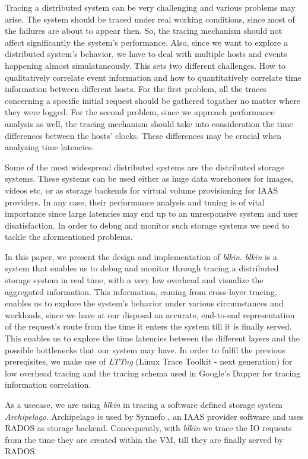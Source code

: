 \documentclass[a4paper,10pt,twocolumn]{article}
\begin{document}
Tracing a distributed system can be very challenging and various problems may
arise. The system should be traced under real working conditions, since most of
the failures are about to appear then. So, the tracing mechanism should not
affect significantly the system's performance. Also, since we want to explore a
distributed system's behavior, we have to deal with multiple hosts and events
happening almost simulataneously. This sets two different challenges.  How to
qualitatively correlate event information and how to quantitatively correlate
time information between different hosts. For the first problem, all the traces
concerning a specific initial request should be gathered togather no matter
where they were logged. For the second problem, since we approach performance
analysis as well, the tracing mechanism should take into consideration the time
differences between the hosts' clocks. These differences may be crucial when
analyzing time latencies.

Some of the most widespread distributed systems are the distributed storage
systems. These systems can be used either as huge data warehouses for images,
videos etc, or as storage backends for virtual volume provisioning for IAAS
providers. In any case, their performance analysis and tuning is of vital
importance since large latencies may end up to an unresponsive system and user
disatisfaction. In order to debug and monitor such storage systems we need to
tackle the aformentioned problems.

In this paper, we present the design and implementation of \emph{blkin}.
\emph{blkin} is a system that enables us to debug and monitor through tracing a
distributed storage system in real time, with a very low overhead and visualize
the aggregated information. This information, caming from cross-layer tracing,
enables us to explore the system's behavior under various circumstances and
workloads, since we have at our disposal an accurate, end-to-end representation
of the request's route from the time it enters the system till it is finally
served. This enables us to explore the time latencies between the different
layers and the possible bottlenecks that our system may have. In order to fulfil
the previous prereqisites, we make use of \emph{LTTng} (Linux Trace Toolkit -
next generation)\cite{lttng} for low overhead tracing and the tracing schema
used in Google's Dapper for tracing information correlation.

As a usecase, we are using \emph{blkin} in tracing a software defined storage
system \emph{Archipelago}\cite{archip}. Archipelago is used by Synnefo
\cite{synnefo}, an IAAS provider software and uses RADOS\cite{rados} as storage
backend. Concequently, with \emph{blkin} we trace the IO requests from the time
they are created within the VM, till they are finally served by RADOS.
\end{document}
